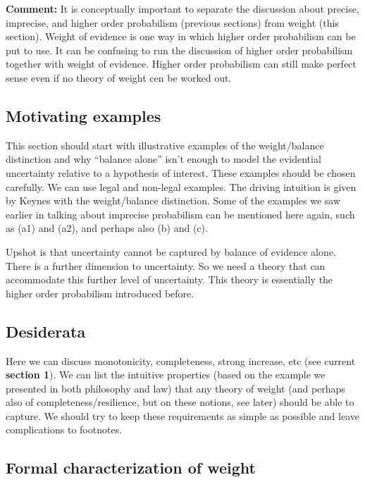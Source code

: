 \documentclass[
  10pt,
  dvipsnames,enabledeprecatedfontcommands]{scrartcl}
\begin{document}
\textbf{Comment:} It is conceptually important to separate the
discussion about precise, imprecise, and higher order probabilism
(previous sections) from weight (this section). Weight of evidence is
one way in which higher order probabilism can be put to use. It can be
confusing to run the discussion of higher order probabilism together
with weight of evidence. Higher order probabilism can still make perfect
sense even if no theory of weight cen be worked out.

\hypertarget{motivating-examples}{%
\subsection{Motivating examples}\label{motivating-examples}}

This section should start with illustrative examples of the
weight/balance distinction and why ``balance alone'' isn't enough to
model the evidential uncertainty relative to a hypothesis of interest.
These examples should be chosen carefully. We can use legal and
non-legal examples. The driving intuition is given by Keynes with the
weight/balance distinction. Some of the examples we saw earlier in
talking about imprecise probabilism can be mentioned here again, such as
(a1) and (a2), and perhaps also (b) and (c).

Upshot is that uncertainty cannot be captured by balance of evidence
alone. There is a further dimension to uncertainty. So we need a theory
that can accommodate this further level of uncertainty. This theory is
essentially the higher order probabilism introduced before.

\hypertarget{desiderata}{%
\subsection{Desiderata}\label{desiderata}}

Here we can discuss monotonicity, completeness, strong increase, etc
(see current \textbf{section 1}). We can list the intuitive properties
(based on the example we presented in both philosophy and law) that any
theory of weight (and perhaps also of completeness/resilience, but on
these notions, see later) should be able to capture. We should try to
keep these requirements as simple as possible and leave complications to
footnotes.

\hypertarget{formal-characterization-of-weight}{%
\subsection{Formal characterization of
weight}\label{formal-characterization-of-weight}}
\end{document}
